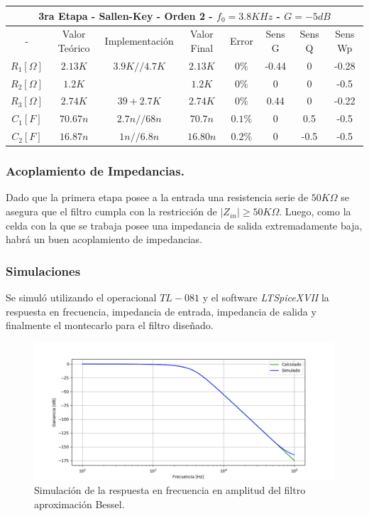 \begin{table}[H]
\centering
\begin{tabular}{@{}cccccccc@{}}
\multicolumn{8}{c}{3ra Etapa - Sallen-Key - Orden 2 - $f_0 = 3.8KHz$ - $G=-5dB$} \\ \midrule
- & Valor Teórico & Implementación & Valor Final & Error & Sens G & Sens Q & Sens Wp \\ \midrule
$R_1 [\Omega]$ & $2.13K$ & $3.9K//4.7K$ & $2.13K$ & $0\%$ & -0.44 & 0 & -0.28 \\
$R_2 [\Omega]$ & $1.2K$ &  & $1.2K$ & $0\%$ & 0 & 0 & -0.5 \\
$R_3 [\Omega]$ & $2.74K$ & $39+2.7K$ & $2.74K$ & $0\%$ & 0.44 & 0 & -0.22 \\
$C_1 [F]$ & $70.67n$ & $2.7n//68n$ & $70.7n$ & $0.1\%$ & 0 & 0.5 & -0.5 \\
$C_2 [F]$ & $16.87n$ & $1n//6.8n$ & $16.80n$ & $0.2\%$ & 0 & -0.5 & -0.5 \\ \bottomrule
\end{tabular}
\end{table}

\subsubsection{Acoplamiento de Impedancias.}
Dado que la primera etapa posee a la entrada una resistencia serie de $50K\Omega$ se asegura que el filtro cumpla con la restricción de $|Z_{in}| \geq 50K\Omega$. Luego, como la celda con la que se trabaja posee una impedancia de salida extremadamente baja, habrá un buen acoplamiento de impedancias.

\subsubsection{Simulaciones}

Se simuló utilizando el operacional $TL-081$ y el software \textit{LTSpiceXVII} la respuesta en frecuencia, impedancia de entrada, impedancia de salida y finalmente el montecarlo para el filtro diseñado.

\begin{figure}[H]
\centering
	\centering
	\includegraphics[width=\textwidth]{Imagenes-Ej1/bessel_hs_sim.png}
	\caption{Simulación de la respuesta en frecuencia en amplitud del filtro aproximación Bessel.}
	\label{bes_gain_sim}
\end{figure}

